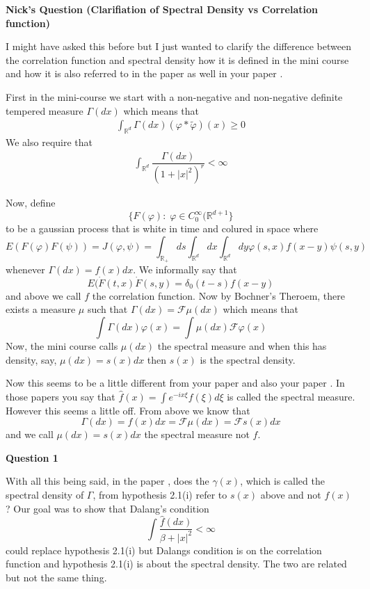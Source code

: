 \documentclass[a4paper,11pt]{article}
\theoremstyle{plain}
\theoremstyle{definition}
\newcounter{NQ}
\newenvironment{NickQuestion}[1][] %
  {\refstepcounter{NQ}
  \begin{mdframed}[backgroundcolor=lightgray]\textbf{Nick's Question \theNQ \: #1~~}~~~\noindent}%
  {\end{mdframed}}
\numberwithin{NQ}{section}
\numberwithin{LQ}{section}
\numberwithin{ZQ}{section}
\begin{document}
 \begin{NickQuestion}[(Clarifiation of Spectral Density vs Correlation function)]
 
 I might have asked this before but I just wanted to clarify the difference between the correlation function and spectral density how it is defined in the mini course and how it is also referred to in the paper \cite{TessitoreZabczyk98M} as well in your paper \cite{CH16Comparison}.  

 First in the mini-course we start with a non-negative and non-negative definite tempered measure $\Gamma(dx)$ which means that \begin{align} \int_{\mathbb R^d}\Gamma(dx)(\varphi * \tilde \varphi)(x) \ge 0 \end{align}
 We also require that 
\begin{align}
    \int_{\mathbb R^d}\dfrac{\Gamma(dx)}{(1+|x|^2)^r} < \infty
\end{align}
 
 Now, define $$ \{F(\varphi): \; \varphi \in C_0^\infty(\mathbb R^{d+1} \} $$ to be a gaussian process that is white in time and colured in space where $$ E(F(\varphi)F(\psi)) = J(\varphi,\psi)=\int_{\mathbb R_+}ds\int_{\mathbb R^d}dx\int_{\mathbb R^d}dy\varphi(s,x)f(x-y)\psi(s,y) $$
 whenever $\Gamma(dx)=f(x)dx$. We informally say that $$ E(\dot F(t,x)\dot F(s,y) = \delta_0(t-s)f(x-y) $$ and above we call $f$ the correlation function. 
 Now by Bochner's Theroem, there exists a measure $\mu$ such that $\Gamma(dx)=\mathcal F\mu(dx)$ which means that $$ \int \Gamma(dx) \varphi(x) = \int \mu(dx)\mathcal F \varphi (x) $$
 Now, the mini course calls $\mu(dx)$ the spectral measure and when this has density, say, $\mu(dx)=s(x)dx$ then $s(x)$ is the spectral density. 
 
 \vspace{.1 in}
 Now this seems to be a little different from your paper \cite{CH16Comparison} and also your paper \cite{CK15SHE}. In those papers you say that $\hat f(x) = \int e^{-i x \xi}f(\xi)d\xi$ is called the spectral measure. However this seems a little off. From above we know that $$\Gamma(dx) = f(x)dx = \mathcal F \mu (dx) = \mathcal F s(x) dx $$ and we call $\mu(dx) = s(x)dx$ the spectral measure not $\hat f$.
 
 \vspace{.1 in} 
 \textbf{Question 1}
 
 With all this being said, in the paper \cite{TessitoreZabczyk98M}, does the $\gamma(x)$, which is called the spectral density of $\Gamma$, from hypothesis 2.1(i) refer to $s(x)$ above and not $f(x)$? Our goal was to show that Dalang's condition $$ \int \dfrac{\hat f(dx)}{\beta + |x|^2} < \infty $$ could replace hypothesis 2.1(i) but Dalangs condition is on the correlation function and hypothesis 2.1(i) is about the spectral density. The two are related but not the same thing. 
  

\end{NickQuestion}
\end{document}
